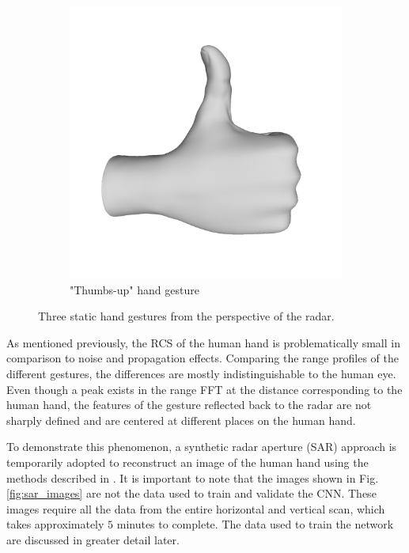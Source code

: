 \documentclass{ieeeaccess}
\begin{document}
\begin{figure}
\begin{subfigure}[b]{0.23\textwidth}
         \includegraphics[width=\textwidth]{smith6.png}
         \caption{"Thumbs-up" hand gesture}
         \label{fig:tu}
     \end{subfigure}
        \caption{Three static hand gestures from the perspective of the radar.}
        \label{fig:hand_gestures}
\end{figure}

As mentioned previously, the RCS of the human hand is problematically small in comparison to noise and propagation effects. Comparing the range profiles of the different gestures, the differences are mostly indistinguishable to the human eye. Even though a peak exists in the range FFT at the distance corresponding to the human hand, the features of the gesture reflected back to the radar are not sharply defined and are centered at different places on the human hand. 

To demonstrate this phenomenon, a synthetic radar aperture (SAR) approach is temporarily adopted to reconstruct an image of the human hand using the methods described in \cite{muhammet:testbeds,Sheen:NearField3DRadarImaging}. It is important to note that the images shown in Fig. \ref{fig:sar_images} are not the data used to train and validate the CNN. These images require all the data from the entire horizontal and vertical scan, which takes approximately $5$ minutes to complete. The data used to train the network are discussed in greater detail later. 
\end{document}
